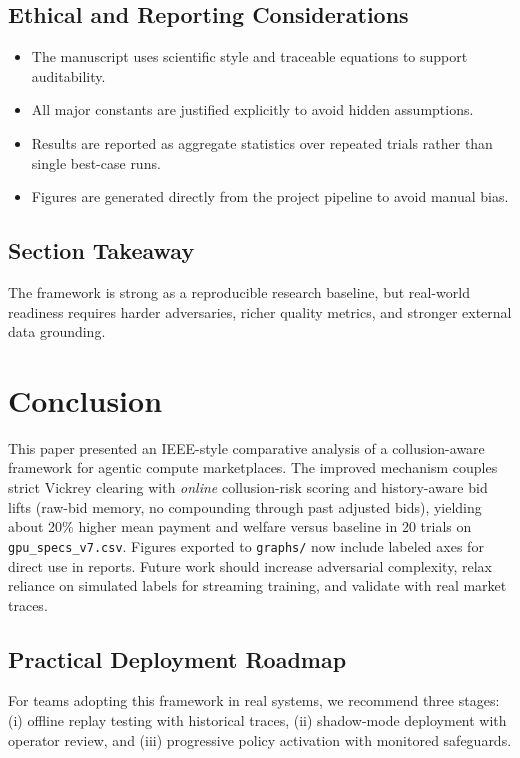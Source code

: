 \documentclass[journal]{IEEEtran}
\begin{document}
\subsection{Ethical and Reporting Considerations}
\begin{itemize}[leftmargin=*]
    \item The manuscript uses scientific style and traceable equations to support auditability.
    \item All major constants are justified explicitly to avoid hidden assumptions.
    \item Results are reported as aggregate statistics over repeated trials rather than single best-case runs.
    \item Figures are generated directly from the project pipeline to avoid manual bias.
\end{itemize}

\subsection{Section Takeaway}
The framework is strong as a reproducible research baseline, but real-world readiness requires harder adversaries, richer quality metrics, and stronger external data grounding.

\section{Conclusion}
This paper presented an IEEE-style comparative analysis of a collusion-aware framework for agentic compute marketplaces. The improved mechanism couples strict Vickrey clearing with \emph{online} collusion-risk scoring and history-aware bid lifts (raw-bid memory, no compounding through past adjusted bids), yielding about 20\% higher mean payment and welfare versus baseline in 20 trials on \texttt{gpu\_specs\_v7.csv}. Figures exported to \texttt{graphs/} now include labeled axes for direct use in reports. Future work should increase adversarial complexity, relax reliance on simulated labels for streaming training, and validate with real market traces.

\subsection{Practical Deployment Roadmap}
For teams adopting this framework in real systems, we recommend three stages: (i) offline replay testing with historical traces, (ii) shadow-mode deployment with operator review, and (iii) progressive policy activation with monitored safeguards.
\end{document}
